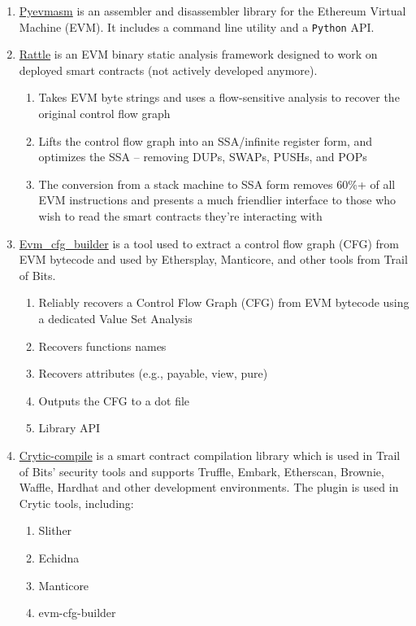 \begin{enumerate}
\item\href{https://github.com/crytic/pyevmasm}{Pyevmasm} is an assembler and disassembler library for the Ethereum Virtual Machine (EVM). It includes a command line utility and a \verb|Python| API.

\item\href{https://github.com/crytic/rattle}{Rattle} is an EVM binary static analysis framework designed to work on deployed smart contracts (not actively developed anymore).
	\begin{enumerate}
	\item Takes EVM byte strings and uses a flow-sensitive analysis to recover the original control flow graph
	\item Lifts the control flow graph into an SSA/infinite register form, and optimizes the SSA – removing DUPs, SWAPs, PUSHs, and POPs
	\item The conversion from a stack machine to SSA form removes 60\%+ of all EVM instructions and presents a much friendlier interface to those who wish to read the smart contracts they’re interacting with
	\end{enumerate}

\item\href{https://github.com/crytic/evm\_cfg\_builder}{Evm\_cfg\_builder} is a tool used to extract a control flow graph (CFG) from EVM bytecode and used by Ethersplay, Manticore, and other tools from Trail of Bits.
	\begin{enumerate}
	\item Reliably recovers a Control Flow Graph (CFG) from EVM bytecode using a dedicated Value Set Analysis
	\item Recovers functions names
	\item Recovers attributes (e.g., payable, view, pure)
	\item Outputs the CFG to a dot file
	\item Library API
	\end{enumerate}

\item\href{https://github.com/crytic/crytic-compile}{Crytic-compile} is a smart contract compilation library which is used in Trail of Bits’ security tools and supports Truffle, Embark, Etherscan, Brownie, Waffle, Hardhat and other development environments. The plugin is used in Crytic tools, including:
	\begin{enumerate}
	\item Slither
	\item Echidna
	\item Manticore
	\item evm-cfg-builder
	\end{enumerate}


\end{enumerate}
